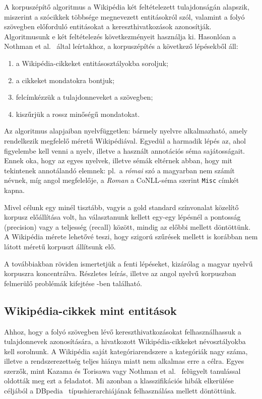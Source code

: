 \documentclass{llncs}
\begin{document}
A korpuszépítő algoritmus a Wikipédia két feltételezett tulajdonságán alapszik, miszerint a szócikkek többsége megnevezett entitásokról szól, valamint a folyó szövegben előforduló entitásokat a kereszthivatkozások azonosítják. Algoritmusunk e két feltételezés következményeit használja ki. Hasonlóan a Nothman et al.~\cite{Nothman:08} által leírtakhoz, a korpuszépítés a következő lépésekből áll:

\begin{enumerate}
\item a Wikipédia-cikkeket entitásosztályokba soroljuk;
\item a cikkeket mondatokra bontjuk;
\item felcímkézzük a tulajdonneveket a szövegben;
\item kiszűrjük a rossz minőségű mondatokat.
\end{enumerate}

Az algoritmus alapjaiban nyelvfüggetlen: bármely nyelvre alkalmazható, amely
rendelkezik megfelelő méretű Wikipédiával. Egyedül a harmadik lépés az, ahol
figyelembe kell venni a nyelv, illetve a használt annotációs séma sajátosságait.
Ennek oka, hogy az egyes nyelvek, illetve sémák eltérnek abban, hogy
mit tekintenek annotálandó elemnek: pl.~a \textit{római} szó a magyarban nem
számít névnek, míg angol megfelelője, a \textit{Roman} a CoNLL-séma
szerint \texttt{Misc} címkét kapna.

Mivel célunk egy minél tisztább, vagyis a gold standard színvonalat közelítő korpusz előállítása volt, ha választanunk
kellett egy-egy lépésnél a pontosság (precision) vagy a teljesség (recall)
között, mindig az előbbi mellett döntöttünk. A Wikipédia mérete lehetővé teszi,
hogy szigorú szűrések mellett is korábban nem látott méretű korpuszt állítsunk elő.

A továbbiakban röviden ismertetjük a fenti lépéseket, kizárólag a magyar nyelvű korpuszra
koncentrálva. Részletes leírás, illetve az angol nyelvű korpuszban felmerülő
problémák kifejtése \cite{simon-nemeskey:2012:NEWS2012}-ben található.

\subsection{Wikipédia-cikkek mint entitások}
\label{corpusbuilding:entities}

Ahhoz, hogy a folyó szövegben lévő kereszthivatkozásokat felhasználhassuk a
tulajdonnevek azonosítására, a hivatkozott Wikipédia-cikkeket névosztályokba kell
sorolnunk. A Wikipédia saját kategóriarendszere a kategóriák nagy
száma, illetve a rendszerezettség teljes hiánya miatt nem alkalmas erre a célra. Egyes
szerzők, mint Kazama és Torisawa \cite{KaTo07} vagy Nothman et
al.~\cite{Nothman:08} felügyelt tanulással oldották meg ezt a feladatot. Mi
azonban a klasszifikációs hibák elkerülése céljából a DBpedia~\cite{Bizer:09}
típushierarchiájának felhasználása mellett döntöttünk.
\end{document}
